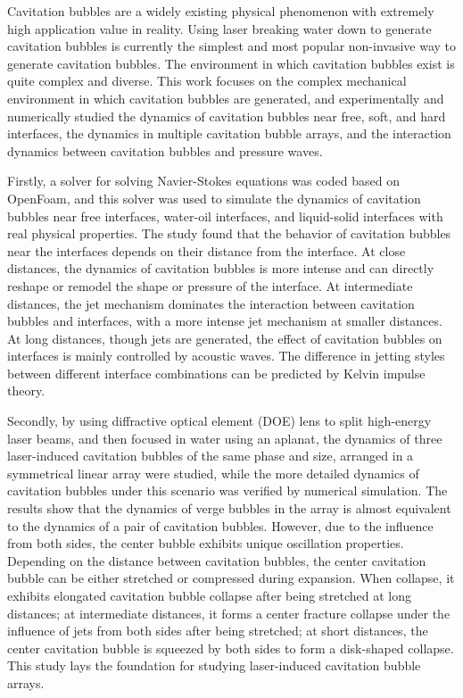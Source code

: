 \begin{englishabstract}

Cavitation bubbles are a widely existing physical phenomenon with extremely high application value in reality. Using laser breaking water down to generate cavitation bubbles is currently the simplest and most popular non-invasive way to generate cavitation bubbles. The environment in which cavitation bubbles exist is quite complex and diverse. This work focuses on the complex mechanical environment in which cavitation bubbles are generated, and experimentally and numerically studied the dynamics of cavitation bubbles near free, soft, and hard interfaces, the dynamics in multiple cavitation bubble arrays, and the interaction dynamics between cavitation bubbles and pressure waves.

Firstly, a solver for solving Navier-Stokes equations was coded based on OpenFoam, and this solver was used to simulate the dynamics of cavitation bubbles near free interfaces, water-oil interfaces, and liquid-solid interfaces with real physical properties. The study found that the behavior of cavitation bubbles near the interfaces depends on their distance from the interface. At close distances, the dynamics of cavitation bubbles is more intense and can directly reshape or remodel the shape or pressure of the interface. At intermediate distances, the jet mechanism dominates the interaction between cavitation bubbles and interfaces, with a more intense jet mechanism at smaller distances. At long distances, though jets are generated, the effect of cavitation bubbles on interfaces is mainly controlled by acoustic waves. The difference in jetting styles between different interface combinations can be predicted by Kelvin impulse theory.

Secondly, by using diffractive optical element (DOE) lens to split high-energy laser beams, and then focused in water using an aplanat, the dynamics of three laser-induced cavitation bubbles of the same phase and size, arranged in a symmetrical linear array were studied, while the more detailed dynamics of cavitation bubbles under this scenario was verified by numerical simulation. The results show that the dynamics of verge bubbles in the array is almost equivalent to the dynamics of a pair of cavitation bubbles. However, due to the influence from both sides, the center bubble exhibits unique oscillation properties. Depending on the distance between cavitation bubbles, the center cavitation bubble can be either stretched or compressed during expansion. When collapse, it exhibits elongated cavitation bubble collapse after being stretched at long distances; at intermediate distances, it forms a center fracture collapse under the influence of jets from both sides after being stretched; at short distances, the center cavitation bubble is squeezed by both sides to form a disk-shaped collapse. This study lays the foundation for studying laser-induced cavitation bubble arrays.


\end{englishabstract}
